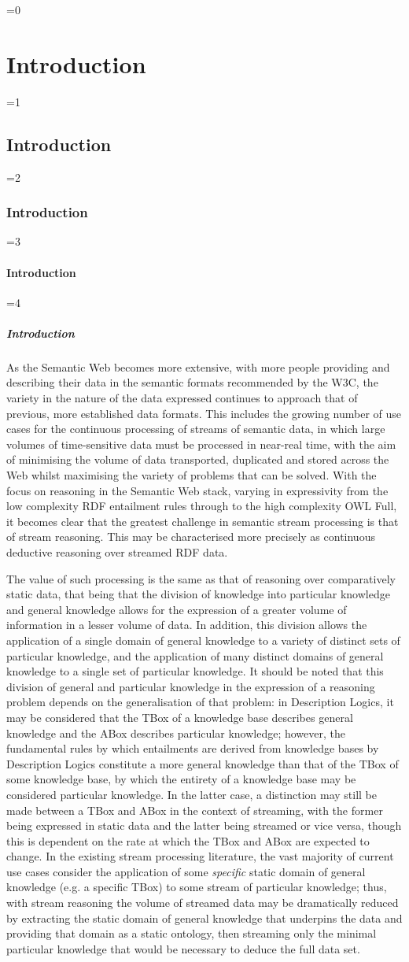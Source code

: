 \documentclass[twocolumn,preprint,3p,number]{elsarticle}
\theoremstyle{plain}
\theoremstyle{definition}
\newcounter{nestingdepth}
\newenvironment{nestedsection}[2]{
  \ifnum\value{nestingdepth}=0
    \chapter{#1}
  \else
    \ifnum\value{nestingdepth}=1
      \section{#1}
    \else
      \ifnum\value{nestingdepth}=2
        \subsection{#1}
      \else
        \ifnum\value{nestingdepth}=3
          \subsubsection{#1}
        \else
          \ifnum\value{nestingdepth}=4
            \paragraph{#1}
          \else
            \PackageError{nestedsections}{Maximum nesting level exceeded!}{uh oh!}
          \fi
        \fi
      \fi
    \fi
  \fi
  \addtocounter{nestingdepth}{1}
  \label{sec:#2}
}{\addtocounter{nestingdepth}{-1}}
\begin{document}
\begin{nestedsection}{Introduction}{intro}
  As the Semantic Web becomes more extensive, with more people providing and describing their data in the semantic formats recommended by the W3C, the variety in the nature of the data expressed continues to approach that of previous, more established data formats.
  This includes the growing number of use cases for the continuous processing of streams of semantic data, in which large volumes of time-sensitive data must be processed in near-real time, with the aim of minimising the volume of data transported, duplicated and stored across the Web whilst maximising the variety of problems that can be solved.
  With the focus on reasoning in the Semantic Web stack, varying in expressivity from the low complexity RDF entailment rules through to the high complexity OWL Full, it becomes clear that the greatest challenge in semantic stream processing is that of stream reasoning.
  This may be characterised more precisely as continuous deductive reasoning over streamed RDF data.
  
  The value of such processing is the same as that of reasoning over comparatively static data, that being that the division of knowledge into particular knowledge and general knowledge allows for the expression of a greater volume of information in a lesser volume of data.
  In addition, this division allows the application of a single domain of general knowledge to a variety of distinct sets of particular knowledge, and the application of many distinct domains of general knowledge to a single set of particular knowledge.
  It should be noted that this division of general and particular knowledge in the expression of a reasoning problem depends on the generalisation of that problem:
  in Description Logics, it may be considered that the TBox of a knowledge base describes general knowledge and the ABox describes particular knowledge;
  however, the fundamental rules by which entailments are derived from knowledge bases by Description Logics constitute a more general knowledge than that of the TBox of some knowledge base, by which the entirety of a knowledge base may be considered particular knowledge.
  In the latter case, a distinction may still be made between a TBox and ABox in the context of streaming, with the former being expressed in static data and the latter being streamed or vice versa, though this is dependent on the rate at which the TBox and ABox are expected to change.
  In the existing stream processing literature, the vast majority of current use cases consider the application of some \emph{specific} static domain of general knowledge (e.g. a specific TBox) to some stream of particular knowledge;
  thus, with stream reasoning the volume of streamed data may be dramatically reduced by extracting the static domain of general knowledge that underpins the data and providing that domain as a static ontology, then streaming only the minimal particular knowledge that would be necessary to deduce the full data set.


\end{nestedsection}
\end{document}

